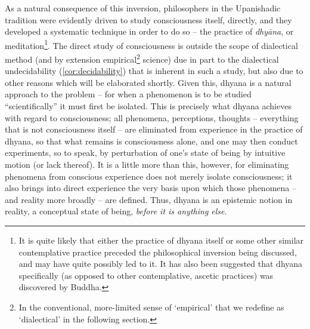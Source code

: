 \documentclass[pra,twocolumn,groupedaddress,10pt]{revtex4}
\theoremstyle{definition}
\begin{document}
As a natural consequence of this inversion, philosophers in the Upanishadic tradition were evidently driven to study consciousness itself, directly, and they developed a systematic technique in order to do so -- the practice of \emph{dhy\={a}na}, or meditation\footnote{It is quite likely that either the practice of dhyana itself or some other similar contemplative practice preceded the philosophical inversion being discussed, and may have quite possibly led to it. It has also been suggested\cite{bronkhorst} that dhyana specifically (as opposed to other contemplative, ascetic practices) was discovered by Buddha.}. The direct study of consciousness is outside the scope of dialectical method (and by extension empirical\footnote{In the conventional, more-limited sense of `empirical' that we redefine as `dialectical' in the following section.} science) due in part to the dialectical undecidability (\autoref{cor:decidability}) that is inherent in such a study, but also due to other reasons which will be elaborated shortly. Given this, dhyana is a natural approach to the problem -- for when a phenomenon is to be studied ``scientifically'' it must first be isolated. This is precisely what dhyana achieves with regard to consciousness; all phenomena, perceptions, thoughts -- everything that is not consciousness itself -- are eliminated from experience in the practice of dhyana, so that what remains is consciousness alone, and one may then conduct experiments, so to speak, by perturbation of one's state of being by intuitive motion (or lack thereof). It is a little more than this, however, for eliminating phenomena from conscious experience does not merely isolate consciousness; it also brings into direct experience the very basis upon which those phenomena -- and reality more broadly -- are defined. Thus, dhyana is an epistemic notion in reality, a conceptual state of being, \textit{before it is anything else}.
\end{document}
